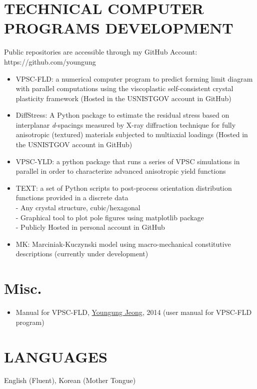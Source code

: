 \documentclass{res}
\begin{document}
\begin{resume}
  \section{TECHNICAL COMPUTER PROGRAMS DEVELOPMENT}
  Public repositories are accessible through my GitHub Account: https://github.com/youngung
  \begin{itemize}
  \item VPSC-FLD: a numerical computer program to predict forming limit diagram with parallel computations using the viscoplastic self-consistent crystal plasticity framework (Hosted in the USNISTGOV account in GitHub) \\
  \item DiffStress: A Python package to estimate the residual stress based on interplanar \emph{d}-spacings measured by X-ray diffraction technique for fully anisotropic (textured) materials subjected to multiaxial loadings (Hosted in the USNISTGOV account in GitHub) \\
  \item VPSC-YLD: a python package that runs a series of VPSC simulations in parallel in order to characterize advanced anisotropic yield functions \\
  \item TEXT: a set of Python scripts to post-process orientation distribution functions provided in a discrete data \\
    - Any crystal structure, cubic/hexagonal\\
    - Graphical tool to plot pole figures using matplotlib package\\
    - Publicly Hosted in personal account in GitHub\\
  \item MK: Marciniak-Kuczynski model using macro-mechanical constitutive descriptions (currently under development)
  \end{itemize}

  \section{Misc.}
  \begin{itemize}
  \item Manual for VPSC-FLD, \underline{Youngung Jeong}, 2014 (user manual for VPSC-FLD program)
  \end{itemize}

  \section{LANGUAGES}
  English (Fluent), Korean (Mother Tongue)


\end{resume}
\end{document}
